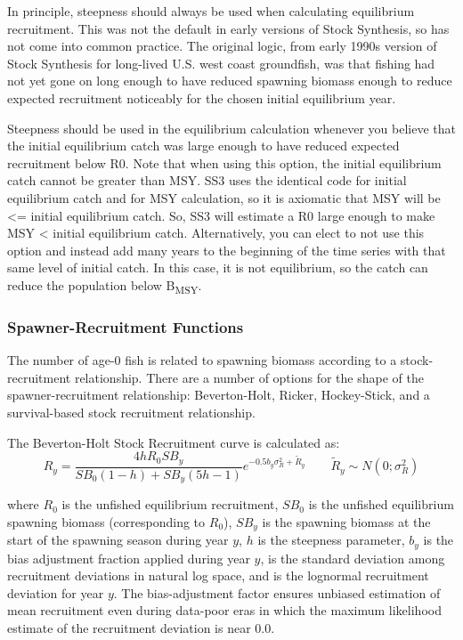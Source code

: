 In principle, steepness should always be used when calculating equilibrium recruitment. This was not the default in early versions of Stock Synthesis, so has not come into common practice. The original logic, from early 1990s version of Stock Synthesis for long-lived U.S. west coast groundfish, was that fishing had not yet gone on long enough to have reduced spawning biomass enough to reduce expected recruitment noticeably for the chosen initial equilibrium year.

Steepness should be used in the equilibrium calculation whenever you believe that the initial equilibrium catch was large enough to have reduced expected recruitment below R0. Note that when using this option, the initial equilibrium catch cannot be greater than MSY. SS3 uses the identical code for initial equilibrium catch and for MSY calculation, so it is axiomatic that MSY will be <= initial equilibrium catch. So, SS3 will estimate a R0 large enough to make MSY < initial equilibrium catch. Alternatively, you can elect to not use this option and instead add many years to the beginning of the time series with that same level of initial catch. In this case, it is not equilibrium, so the catch can reduce the population below B\textsubscript{MSY}.

\subsubsection{Spawner-Recruitment Functions}
The number of age-0 fish is related to spawning biomass according to a stock-recruitment relationship. There are a number of options for the shape of the spawner-recruitment relationship: Beverton-Holt, Ricker, Hockey-Stick, and a survival-based stock recruitment relationship.

\hypertarget{BH}{}
The Beverton-Holt Stock Recruitment curve is calculated as:
\begin{equation}{R_y = \frac{4hR_0SB_y}{SB_0(1-h)+SB_y(5h-1)}e^{-0.5b_y\sigma^2_R+\tilde{R}_y}\qquad  \tilde{R}_y\sim N(0;\sigma^2_R)}
\end{equation}

where $R_0$ is the unfished equilibrium recruitment, $SB_0$ is the unfished equilibrium spawning biomass (corresponding to $R_0$), $SB_y$ is the spawning biomass at the start of the spawning season during year $y$, $h$ is the steepness parameter, $b_y$ is the bias adjustment fraction applied during year $y$, is the standard deviation among recruitment deviations in natural log space, and is the lognormal recruitment deviation for year $y$. The bias-adjustment factor \citep{methot-adjusting-2011} ensures unbiased estimation of mean recruitment even during data-poor eras in which the maximum likelihood estimate of the recruitment deviation is near 0.0.

